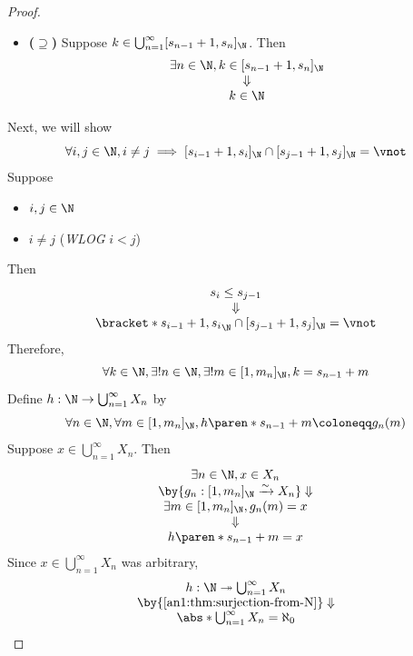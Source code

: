 \begin{proof}
\begin{itemize}
\[          \]
          Then
          \[
            \begin{array}{c}
              s_{n_{k} - 1} \leq k < s_{n_{k}} \\
              \Downarrow                       \\
              k \in [s_{n_{k} - 1} + 1, s_{n_{k}}]_{\N}
            \end{array}
          \]
    \item \textbf{($\supseteq$)} Suppose $k \in \bigcup_{n = 1}^{\infty} [s_{n - 1} + 1, s_{n}]_{\N}$. Then
          \[
            \begin{array}{c}
              \exists n \in \N, k \in [s_{n - 1} + 1, s_{n}]_{\N} \\
              \Downarrow                                          \\
              k \in \N
            \end{array}
          \]
  \end{itemize}
  Next, we will show
  \[
    \forall i, j \in \N, i \neq j \implies [s_{i - 1} + 1, s_{i}]_{\N} \cap [s_{j - 1} + 1, s_{j}]_{\N} = \vnot
  \]
  Suppose
  \begin{itemize}
    \item $i, j \in \N$
    \item $i \neq j$ (\emph{WLOG} $i < j$)
  \end{itemize}
  Then
  \[
    \begin{array}{c}
      s_{i} \leq s_{j - 1} \\
      \Downarrow           \\
      \bracket*{s_{i - 1} + 1, s_{i}}_{\N} \cap [s_{j - 1} + 1, s_{j}]_{\N} = \vnot
    \end{array}
  \]
  Therefore,
  \[
    \forall k \in \N, \exists! n \in \N, \exists! m \in [1, m_{n}]_{\N}, k = s_{n - 1} + m
  \]
  Define $h: \N \to \bigcup_{n = 1}^{\infty} X_{n}$ by
  \[
    \forall n \in \N, \forall m \in [1, m_{n}]_{\N},
    h\paren*{s_{n - 1} + m} \coloneqq g_{n}(m)
  \]
  Suppose $x \in \bigcup_{n = 1}^{\infty} X_{n}$. Then
  \[
    \begin{array}{c}
      \exists n \in \N, x \in X_{n}                                                \\
      \by{\ensuremath{g_{n}: [1, m_{n}]_{\N} \xrightarrow{\sim} X_{n}}} \Downarrow \\
      \exists m \in [1, m_{n}]_{\N}, g_{n}(m) = x                                  \\
      \Downarrow                                                                   \\
      h\paren*{s_{n - 1} + m} = x
    \end{array}
  \]
  Since $x \in \bigcup_{n = 1}^{\infty} X_{n}$ was arbitrary,
  \[
    \begin{array}{c}
      h: \N \twoheadrightarrow \bigcup_{n = 1}^{\infty} X_{n} \\
      \by{\Cref{an1:thm:surjection-from-N}} \Downarrow        \\
      \abs*{\bigcup_{n = 1}^{\infty} X_{n}} = \aleph_{0}
    \end{array}
  \]
\end{proof}

